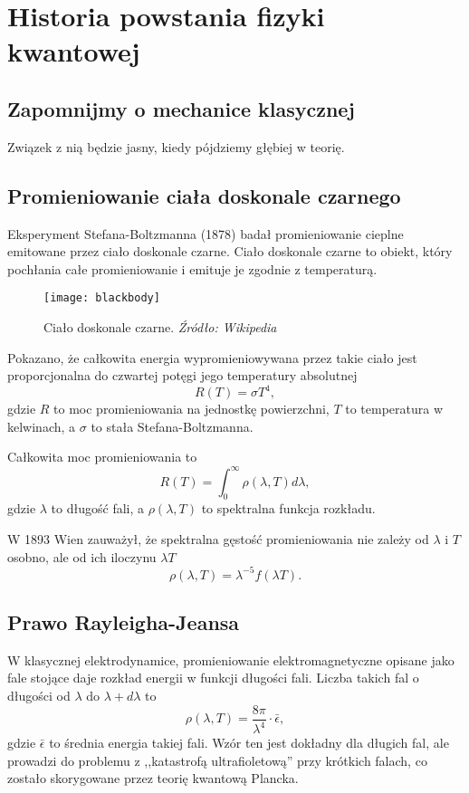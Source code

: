 \section{Historia powstania fizyki kwantowej}

\subsection{Zapomnijmy o mechanice klasycznej}
Związek z nią będzie jasny, kiedy pójdziemy głębiej w teorię.

\subsection{Promieniowanie ciała doskonale czarnego}
Eksperyment Stefana-Boltzmanna (1878) badał promieniowanie cieplne emitowane przez ciało doskonale czarne.
Ciało doskonale czarne to obiekt, który pochłania całe promieniowanie i emituje je zgodnie z temperaturą.
\begin{figure}[H]
    \centering
    \texttt{[image: blackbody]}
    \caption{Ciało doskonale czarne. \textit{Źródło: Wikipedia}}
    \label{fig:blackbody}
\end{figure}

Pokazano, że całkowita energia wypromieniowywana przez takie ciało jest proporcjonalna do czwartej potęgi jego temperatury absolutnej
\begin{equation*}
    R(T) = \sigma T^4,
\end{equation*}
gdzie $R$ to moc promieniowania na jednostkę powierzchni, $T$ to temperatura w kelwinach, a $\sigma$ to stała Stefana-Boltzmanna.

Całkowita moc promieniowania to
\begin{equation*}
    R(T) = \int_0^\infty \rho(\lambda, T) d\lambda,
\end{equation*}
gdzie $\lambda$ to długość fali, a $\rho(\lambda, T)$ to spektralna funkcja rozkładu.

W 1893 Wien zauważył, że spektralna gęstość promieniowania nie zależy od $\lambda$ i $T$ osobno, ale od ich iloczynu $\lambda T$
\begin{equation*}
    \rho(\lambda, T) = \lambda^{-5} f(\lambda T).
\end{equation*}

\subsection{Prawo Rayleigha-Jeansa}
W klasycznej elektrodynamice, promieniowanie elektromagnetyczne opisane jako fale stojące daje rozkład energii w funkcji długości fali.
Liczba takich fal o długości od $\lambda$ do $\lambda + d\lambda$ to
\begin{equation*}
    \rho(\lambda, T) = \frac{8\pi}{\lambda^4} \cdot \bar{\epsilon},
\end{equation*}
gdzie $\bar{\epsilon}$ to średnia energia takiej fali.
Wzór ten jest dokładny dla długich fal, ale prowadzi do problemu z ,,katastrofą ultrafioletową'' przy krótkich falach, co zostało skorygowane przez teorię kwantową Plancka.


